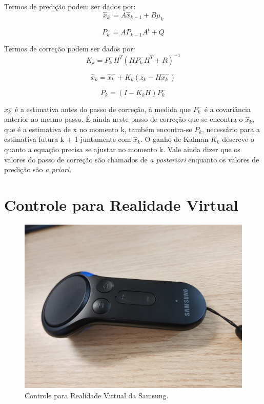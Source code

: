 \documentclass[conference]{IEEEtran}
\begin{document}
Termos de predição podem ser dados por:
\begin{equation}
\hat{x}^{-}_k = A\hat{x}_{k-1} +  B\mu_k
\end{equation}

\begin{equation}
P^{-}_k = AP_{k-1}A^{t} +  Q
\end{equation}

Termos de correção podem ser dados por:
\begin{equation}
K_k = P^{-}_k H^{T} (H P^{-}_k H^{T} + R)^{-1}
\end{equation}

\begin{equation}
\hat{x}_k = \hat{x}^{-}_k + K_k (z_k - H\hat{x}^{-}_k)
\end{equation}

\begin{equation}
P_k = (I - K_kH)  P^{-}_k
\end{equation}

$x^{-}_k$ é a estimativa antes do passo de correção, à medida que $P^{-}_k$ é a covariância anterior ao mesmo passo. É ainda neste passo de correção que se encontra o $\hat{x}_k$, que é a estimativa de x no momento k, também encontra-se $P_k$, necessário para a estimativa futura k + 1 juntamente com $\hat{x}_k$. O ganho de Kalman $K_k$ descreve o quanto a equação precisa se ajustar no momento k. Vale ainda dizer que os valores do passo de correção são chamados de \textit{a posteriori} enquanto os valores de predição são \textit{a priori}.


\section{Controle para Realidade Virtual} \label{sec:vrcontroller}

\begin{figure}[ht]
\centering
\includegraphics[width=.6\textwidth]{images/gear_controller.jpg}
\caption{Controle para Realidade Virtual da Samsung.}
\label{fig:vrcontroller}
\end{figure}
\end{document}
